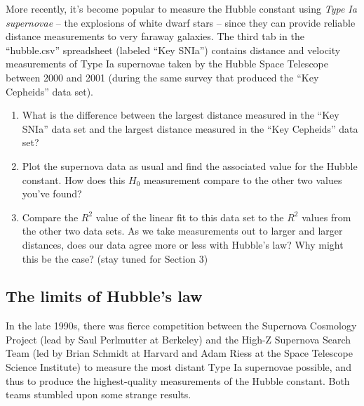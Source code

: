 \documentclass[11pt]{article}
\begin{document}
\noindent
More recently, it's become popular to measure the Hubble constant using \emph{Type Ia supernovae} -- the explosions of white dwarf stars -- since they can provide reliable distance measurements to very faraway galaxies. The third tab in the ``hubble.csv'' spreadsheet (labeled ``Key SNIa'') contains distance and velocity measurements of Type Ia supernovae taken by the Hubble Space Telescope between 2000 and 2001 (during the same survey that produced the ``Key Cepheids'' data set). 

\begin{enumerate}[resume]
    \item What is the difference between the largest distance measured in the ``Key SNIa'' data set and the largest distance measured in the ``Key Cepheids'' data set?
    
    \item Plot the supernova data as usual and find the associated value for the Hubble constant. How does this $H_0$ measurement compare to the other two values you've found?
    
    \item Compare the $R^2$ value of the linear fit to this data set to the $R^2$ values from the other two data sets. As we take measurements out to larger and larger distances, does our data agree more or less with Hubble's law? Why might this be the case? (stay tuned for Section 3)
\end{enumerate}


\subsection{The limits of Hubble's law}

In the late 1990s, there was fierce competition between the Supernova Cosmology Project (lead by Saul Perlmutter at Berkeley) and the High-Z Supernova Search Team (led by Brian Schmidt at Harvard and Adam Riess at the Space Telescope Science Institute) to measure the most distant Type Ia supernovae possible, and thus to produce the highest-quality measurements of the Hubble constant. Both teams stumbled upon some strange results.
\end{document}
